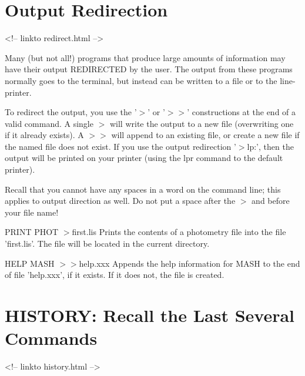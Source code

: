\section{Output Redirection}
\begin{rawhtml}
<!-- linkto redirect.html -->
\end{rawhtml}


Many (but not all!) programs that produce large amounts of information may
have their output REDIRECTED by the user.  The output from these programs
normally goes to the terminal, but instead can be written to a file or to
the line-printer.

To redirect the output, you use the '$>$' or '$>>$' constructions at the
end of a valid command.  A single $>$ will write the output to a new file
(overwriting one if it already exists).  A $>>$ will append to an existing
file, or create a new file if the named file does not exist. If you use the
output redirection '$>$lp:', then the output will be printed on your
printer (using the lpr command to the default printer).

Recall that you cannot have any spaces in a word on the command line; this
applies to output direction as well. Do not put a space after the $>$ and
before your file name!


\begin{example}
  \item[PRINT PHOT $>$first.lis\hfill]{Prints the contents of a 
       photometry file into the file 'first.lis'.  The file will be
       located in the current directory.}
 
   \item[HELP MASH $>>$help.xxx\hfill]{Appends the help information for
        MASH to the end of file 'help.xxx', if it exists.  If it does not,
        the file is created.}
\end{example}

\section{HISTORY: Recall the Last Several Commands }
\begin{rawhtml}
<!-- linkto history.html -->
\end{rawhtml}

